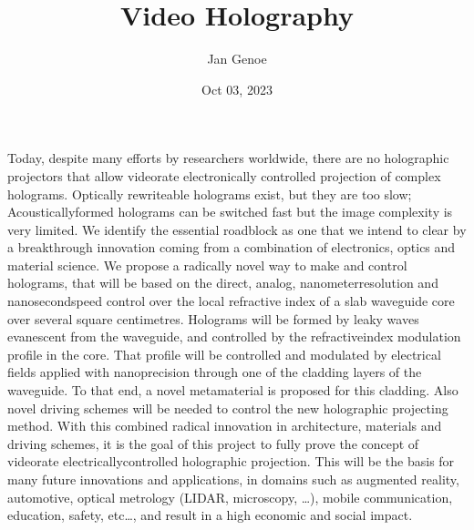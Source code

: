 \documentclass[a4paper,10pt,english,openany,oneside]{jupyterBook}
\title{Video Holography}
\date{Oct 03, 2023}
\author{Jan Genoe}
\begin{document}
\pagestyle{empty}
\sphinxmaketitle
\pagestyle{plain}
\sphinxtableofcontents
\pagestyle{normal}
\label{\detokenize{intro::doc}}


\begin{DUlineblock}{0em}
\item[] 
\end{DUlineblock}

\sphinxAtStartPar
Today, despite many efforts by researchers world\sphinxhyphen{}wide, there are no holographic projectors that allow video\sphinxhyphen{}rate electronically controlled projection of complex holograms. Optically re\sphinxhyphen{}write\sphinxhyphen{}able holograms exist, but they are too slow; Acoustically\sphinxhyphen{}formed holograms can be switched fast but the image complexity is very limited. We identify the essential roadblock as one that we intend to clear by a breakthrough innovation coming from a combination of electronics, optics and material science.
We propose a radically novel way to make and control holograms, that will be based on the direct, analog, nanometer\sphinxhyphen{}resolution and nanosecond\sphinxhyphen{}speed control over the local refractive index of a slab waveguide core over several square centimetres. Holograms will be formed by leaky waves evanescent from the waveguide, and controlled by the refractive\sphinxhyphen{}index modulation profile in the core. That profile will be controlled and modulated by electrical fields applied with nano\sphinxhyphen{}precision through one of the cladding layers of the waveguide. To that end, a novel metamaterial is proposed for this cladding. Also novel driving schemes will be needed to control the new holographic projecting method.
With this combined radical innovation in architecture, materials and driving schemes, it is the goal of this project to fully prove the concept of video\sphinxhyphen{}rate electrically\sphinxhyphen{}controlled holographic projection. This will be the basis for many future innovations and applications, in domains such as augmented reality, automotive, optical metrology (LIDAR, microscopy, …), mobile communication, education, safety, etc…, and result in a high economic and social impact.

\begin{DUlineblock}{0em}
\item[] 
\end{DUlineblock}

\begin{DUlineblock}{0em}
\item[] \sphinxstylestrong{}
\end{DUlineblock}
\end{document}
